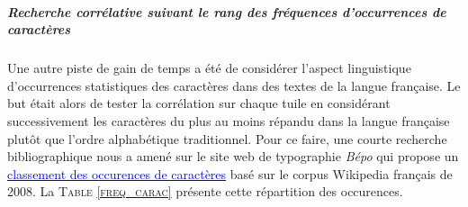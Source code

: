 \documentclass[a4paper,12pt,titlepage]{report}
\begin{document}
	\subparagraph{Recherche corrélative suivant le rang des fréquences d’occurrences de caractères}	 
	 Une autre piste de gain de temps a été de considérer l'aspect linguistique d’occurrences statistiques des caractères dans des textes de la langue française. Le but était alors de tester la corrélation sur chaque tuile en considérant successivement les caractères du plus au moins répandu dans la langue française plutôt que l'ordre alphabétique traditionnel. Pour ce faire, une courte recherche bibliographique nous a amené sur le site web de typographie \textit{Bépo} qui propose un \href{http://bepo.fr/wiki/Fr%C3%A9quence_des_caract%C3%A8res}{\textcolor{blue}{classement des occurences de caractères}} basé sur le corpus Wikipedia français de 2008. La \textsc{Table \ref{freq_carac}} présente cette répartition des occurences. 
	 
\newpage
\end{document}
